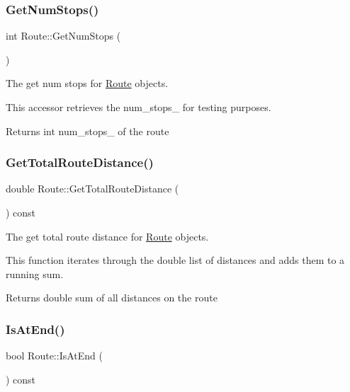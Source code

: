\subsubsection{\texorpdfstring{Get\+Num\+Stops()}{GetNumStops()}}
{\footnotesize\ttfamily int Route\+::\+Get\+Num\+Stops (\begin{DoxyParamCaption}{ }\end{DoxyParamCaption})}



The get num stops for \hyperlink{classRoute}{Route} objects. 

This accessor retrieves the num\+\_\+stops\+\_\+ for testing purposes.

\begin{DoxyReturn}{Returns}
int num\+\_\+stops\+\_\+ of the route 
\end{DoxyReturn}
\mbox{\label{classRoute_af4e0add4a9f6b22963398b41313f9e69}} 
\subsubsection{\texorpdfstring{Get\+Total\+Route\+Distance()}{GetTotalRouteDistance()}}
{\footnotesize\ttfamily double Route\+::\+Get\+Total\+Route\+Distance (\begin{DoxyParamCaption}{ }\end{DoxyParamCaption}) const}



The get total route distance for \hyperlink{classRoute}{Route} objects. 

This function iterates through the double list of distances and adds them to a running sum.

\begin{DoxyReturn}{Returns}
double sum of all distances on the route 
\end{DoxyReturn}
\mbox{\label{classRoute_a529ab995aefd1001b250a6c1ccf77892}} 
\subsubsection{\texorpdfstring{Is\+At\+End()}{IsAtEnd()}}
{\footnotesize\ttfamily bool Route\+::\+Is\+At\+End (\begin{DoxyParamCaption}{ }\end{DoxyParamCaption}) const}



